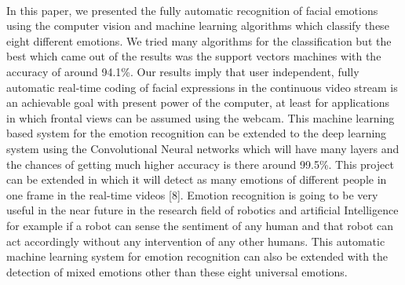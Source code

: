 \documentclass[a4paper,12pt,oneside]{article}
\begin{document}
\paragraph{}
In this paper, we presented the fully automatic
recognition of facial emotions using the computer vision
and machine learning algorithms which classify these
eight different emotions. We tried many algorithms for
the classification but the best which came out of the
results was the support vectors machines with the
accuracy of around 94.1\%. Our results imply that user
independent, fully automatic real-time coding of facial
expressions in the continuous video stream is an
achievable goal with present power of the computer, at
least for applications in which frontal views can be
assumed using the webcam. This machine learning based
system for the emotion recognition can be extended to
the deep learning system using the Convolutional Neural
networks which will have many layers and the chances
of getting much higher accuracy is there around 99.5\%. This project can be extended in which it will detect
as many emotions of different people in one frame in the
real-time videos [8]. Emotion recognition is going to be
very useful in the near future in the research field of
robotics and artificial Intelligence for example if a robot
can sense the sentiment of any human and that robot can
act accordingly without any intervention of any other
humans. This automatic machine learning system for
emotion recognition can also be extended with the
detection of mixed emotions other than these eight
universal emotions.


\newpage
\cleardoublepage
\end{document}
